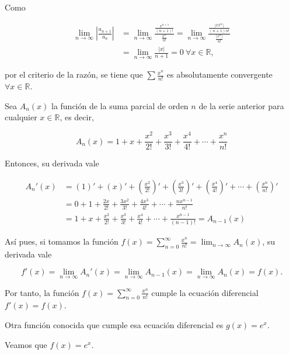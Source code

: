 \documentclass[
  a4paper,
]{scrreport}
\theoremstyle{definition}
\theoremstyle{remark}
\begin{document}
\begin{tcolorbox}[enhanced jigsaw, left=2mm, arc=.35mm, coltitle=black, toprule=.15mm, colback=white, breakable, bottomrule=.15mm, colbacktitle=quarto-callout-tip-color!10!white, bottomtitle=1mm, toptitle=1mm, opacityback=0, titlerule=0mm, opacitybacktitle=0.6, title=\textcolor{quarto-callout-tip-color}{\faLightbulb}\hspace{0.5em}{Solución}, rightrule=.15mm, leftrule=.75mm, colframe=quarto-callout-tip-color-frame]

Como

\begin{align*}
\lim_{n\to\infty} \left|\frac{a_{n+1}}{a_n}\right| &= \lim_{n\to\infty} \frac{\frac{x^{n+1}}{(n+1)!}}{\frac{x^n}{n!}} = \lim_{n\to\infty} \frac{\frac{|xx^n|}{(n+1)n!}}{\frac{|x^n|}{n!}} \\
& = \lim_{n\to\infty} \frac{|x|}{n+1} = 0 \ \forall x\in\mathbb{R},
\end{align*}

por el criterio de la razón, se tiene que \(\sum \frac{x^n}{n!}\) es
absolutamente convergente \(\forall x\in\mathbb{R}\).

Sea \(A_n(x)\) la función de la suma parcial de orden \(n\) de la serie
anterior para cualquier \(x\in\mathbb{R}\), es decir,

\[
A_n(x) = 1 + x + \frac{x^2}{2!} + \frac{x^3}{3!} + \frac{x^4}{4!} + \cdots +\frac{x^n}{n!}
\]

Entonces, su derivada vale

\begin{align*}
A_n'(x) &= (1)' + (x)' + \left(\frac{x^2}{2!}\right)' + \left(\frac{x^3}{3!}\right)' + \left(\frac{x^4}{4!}\right)' + \cdots + \left(\frac{x^n}{n!}\right)'\\
&= 0 + 1 + \frac{2x}{2!} + \frac{3x^2}{3!} + \frac{4x^3}{4!} + \cdots +\frac{nx^{n-1}}{n!} \\
&=  1 + x + \frac{x^2}{2!} + \frac{x^3}{3!} + \frac{x^4}{4!} + \cdots +\frac{x^{n-1}}{(n-1)!} = A_{n-1}(x)
\end{align*}

Así pues, si tomamos la función
\(f(x)=\sum_{n=0}^\infty \frac{x^n}{n!} = \lim_{n\to\infty} A_n(x)\), su
derivada vale

\[
f'(x) = \lim_{n\to\infty} A_n'(x) = \lim_{n\to\infty} A_{n-1}(x) = \lim_{n\to\infty} A_{n}(x) = f(x).
\]

Por tanto, la función \(f(x)=\sum_{n=0}^\infty \frac{x^n}{n!}\) cumple
la ecuación diferencial \(f'(x)=f(x)\).

Otra función conocida que cumple esa ecuación diferencial es
\(g(x)=e^x\).

Veamos que \(f(x)=e^x\).

\end{tcolorbox}
\end{document}
